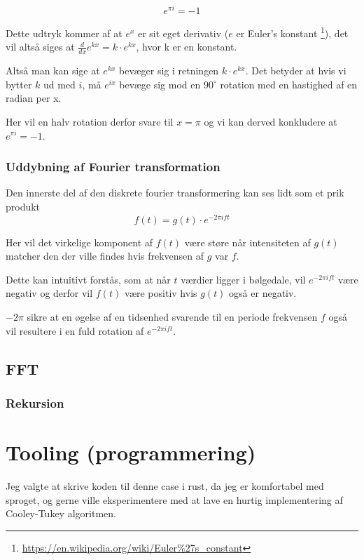 \documentclass[11pt,a4paper]{article}
\begin{document}
$$
e^{\pi i} = -1
$$

Dette udtryk kommer af at \(e^x\) er sit eget derivativ (\(e\) er Euler's konstant \footnote{\url{https://en.wikipedia.org/wiki/Euler\%27s\_constant}}),
det vil altså siges at \(\frac{d}{dx}e^{kx} = k\cdot e^{kx}\), hvor k er en konstant.

Altså man kan sige at \(e^{kx}\) bevæger sig i retningen \(k \cdot e^{kx}\).
Det betyder at hvis vi bytter \(k\) ud med \(i\), må \(e^{ix}\) bevæge sig mod en \(90^\circ\) rotation med en hastighed af en radian per x.

Her vil en halv rotation derfor svare til \(x=\pi\) og vi kan derved konkludere at \(e^{\pi i} = -1\).

\subsubsection{Uddybning af Fourier transformation}
\label{sec:org30372c5}

Den innerste del af den diskrete fourier transformering kan ses lidt som et prik produkt
$$
f(t) = g(t) \cdot e ^{-2\pi ift}
$$

Her vil det virkelige komponent af \(f(t)\) være støre når intensiteten af \(g(t)\)
matcher den der ville findes hvis frekvensen af \(g\) var \(f\).

Dette kan intuitivt forstås, som at når \(t\) værdier ligger i bølgedale, vil \(e^{-2\pi ift}\) være negativ
og derfor vil \(f(t)\) være positiv hvis \(g(t)\) også er negativ.

\(-2\pi\) sikre at en øgelse af en tidsenhed svarende til en periode frekvensen \(f\) også vil resultere
i en fuld rotation af \(e^{-2\pi ift}\).

\subsection{FFT}
\label{sec:org54614df}

\subsubsection{Rekursion}
\label{sec:orgc7aa636}

\section{Tooling (programmering)}
\label{sec:orgac6c0cf}
Jeg valgte at skrive koden til denne case i rust, da jeg er komfortabel med sproget,
og gerne ville eksperimentere med at lave en hurtig implementering af Cooley-Tukey algoritmen.
\end{document}
